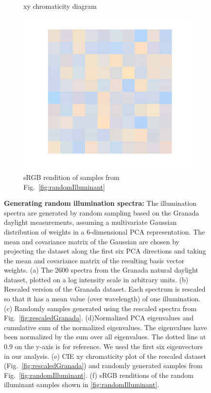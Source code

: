 \documentclass{jov}
\begin{document}
\begin{figure}
\begin{subfigure}[b]{0.3 \textwidth}
        \caption{xy chromaticity diagram}
        \label{fig:xyDiagram}
    \end{subfigure}
      	\begin{subfigure}[b]{0.3 \textwidth}
    \centering
        \includegraphics[width=\textwidth]{../Figures/Figure6/Figure6_f.pdf}
        \caption{sRGB rendition of samples from Fig.~\ref{fig:randomIlluminant}}
        \label{fig:sRGBIlluminant}
    \end{subfigure}
    \caption{{\bf Generating random illumination spectra:} The illumination spectra are generated by random sampling based on the Granada daylight measurements, assuming a multivariate Gaussian distribution of weights in a 6-dimensional PCA representation. The mean and covariance matrix of the Gaussian are chosen by projecting the dataset along the first six PCA directions and taking the mean and covariance matrix of the resulting basis vector weights. (a) The 2600 spectra from the Granada natural daylight dataset, plotted on a log intensity scale in arbitrary units. (b) Rescaled version of the Granada dataset. Each spectrum is rescaled so that it has a mean value (over wavelength) of one illumination. (c) Randomly samples generated using the rescaled spectra from Fig.~\ref{fig:rescaledGranada}. (d)Normalized PCA eigenvalues and cumulative sum of the normalized eigenvalues. The eigenvalues have been normalized by the sum over all eigenvalues. The dotted line at 0.9 on the y-axis is for reference. We used the first six eigenvectors in our analysis. (e) CIE xy chromaticity plot of the rescaled dataset (Fig.~\ref{fig:rescaledGranada}) and randomly generated samples from Fig.~\ref{fig:randomIlluminant}. (f) sRGB renditions of the random illuminant samples shown in \ref{fig:randomIlluminant}.}\label{fig:illluminationGeneration}
\end{figure}
\end{document}
